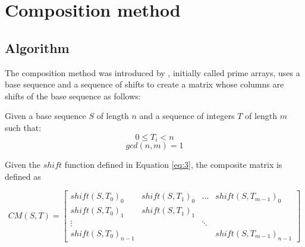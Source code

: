 \section{Composition method}

\subsection{Algorithm}

The composition method  was introduced by \citet{tirkel_composition}, initially called prime
arrays,  uses a base sequence and a sequence of shifts to create a matrix  whose columns are
shifts of the base sequence as follows:

\begin{definition}
  Given a base sequence $S$ of length $n$ and a sequence of integers $T$ of
  length $m$ such that:
  \begin{equation}\label{composition:eq:1}
    0 \leq T_{i} < n
  \end{equation}
  \begin{equation}\label{composition:eq:2}
    gcd(n, m) = 1
  \end{equation}

  Given the $shift$ function defined in Equation \eqref{eq:3},
   the composite matrix is defined as

  \begin{equation}\label{composition:eq:3}
    CM(S, T) = \begin{bmatrix}
      shift(S, T_{0})_{0} & shift(S, T_{1})_{0} & \dots & shift(S, T_{m-1})_{0} \\
      shift(S, T_{0})_{1} & shift(S, T_{1})_{1} \\
      \vdots & & \ddots \\
      shift(S, T_{0})_{n-1} & & & shift(S, T_{m-1})_{n-1}
    \end{bmatrix}
  \end{equation}

\end{definition}

